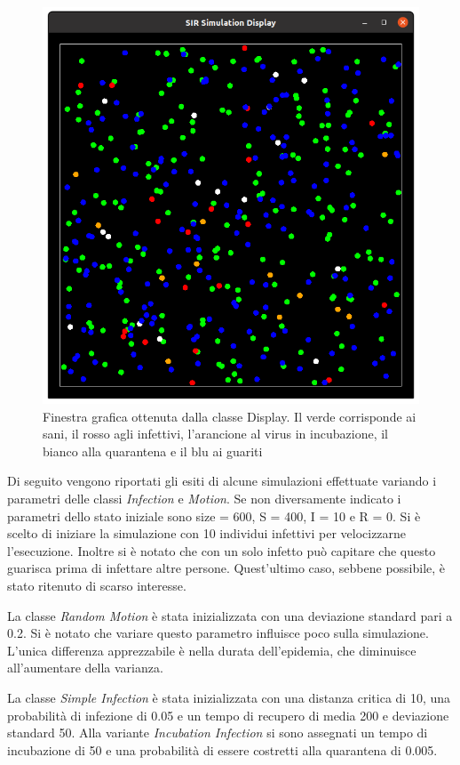 \documentclass[a4paper,10pt,twocolumn]{article}
\begin{document}
\begin{figure}
    \includegraphics[width=\linewidth]{images/display.png}
    \caption{Finestra grafica ottenuta dalla classe Display. Il verde corrisponde ai sani, il rosso agli infettivi, l'arancione al virus in incubazione, il bianco alla quarantena e il blu ai guariti}
    \label{fig:display}
\end{figure}

Di seguito vengono riportati gli esiti di alcune simulazioni effettuate variando i parametri delle classi \emph{Infection} e \emph{Motion}. Se non diversamente indicato i parametri  dello stato iniziale sono size = 600, S = 400, I = 10 e  R = 0. Si è scelto di iniziare la simulazione con 10 individui infettivi per velocizzarne l'esecuzione. Inoltre si è notato che  con un solo infetto può capitare che questo guarisca prima di infettare altre persone. Quest'ultimo caso, sebbene possibile, è stato ritenuto di scarso interesse.

La classe \emph{Random Motion} è stata inizializzata con una deviazione standard pari a 0.2. Si è notato che variare questo parametro influisce poco sulla simulazione. L'unica differenza apprezzabile è nella durata dell'epidemia, che diminuisce all'aumentare della varianza.

La classe \emph{Simple Infection} è stata inizializzata con una distanza critica di 10, una probabilità di infezione di 0.05 e un tempo di recupero di media 200 e deviazione standard 50. Alla variante \emph{Incubation Infection} si sono assegnati un tempo di incubazione di 50 e una probabilità di essere costretti alla quarantena di 0.005.
\end{document}
